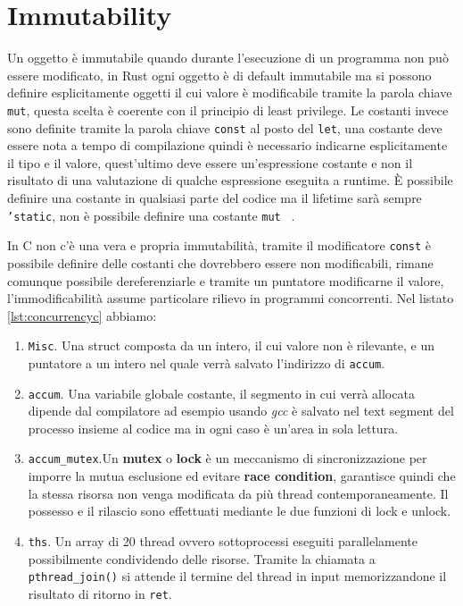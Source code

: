\documentclass[Lau,binding=0.6cm]{sapthesis}
\newcommand{\textcode}[1]{\colorbox{backcolour}{\texttt{#1}}}
\begin{document}
\section{Immutability}
Un oggetto è immutabile quando durante l'esecuzione di un programma non può essere modificato, in Rust ogni oggetto è di default immutabile ma si possono definire esplicitamente oggetti il cui valore è modificabile tramite la parola chiave \textcode{mut}, questa scelta è coerente con il principio di least privilege.
Le costanti invece sono definite tramite la parola chiave \textcode{const} al posto del \textcode{let}, una costante deve essere nota a tempo di compilazione quindi è necessario indicarne esplicitamente il tipo e il valore, quest'ultimo deve essere un'espressione costante e non il risultato di una valutazione di qualche espressione eseguita a runtime.
È possibile definire una costante in qualsiasi parte del codice ma il lifetime sarà sempre \textcode{'static}, non è possibile definire una costante \textcode{mut} ~\cite[3.1]{rust:language}.

In C non c'è una vera e propria immutabilità, tramite il modificatore \textcode{const} è possibile definire delle costanti che dovrebbero essere non modificabili, rimane comunque possibile dereferenziarle e tramite un puntatore modificarne il valore, l'immodificabilità assume particolare rilievo in programmi concorrenti. 
Nel listato \ref{lst:concurrencyc} abbiamo:
\begin{enumerate}
    \item \textcode{Misc}. Una struct composta da un intero, il cui valore non è rilevante, e un puntatore a un intero nel quale verrà salvato l'indirizzo di \textcode{accum}. 
    \item \textcode{accum}. Una variabile globale costante, il segmento in cui verrà allocata dipende dal compilatore ad esempio usando \textit{gcc} è salvato nel text segment del processo insieme al codice ma in ogni caso è un'area in sola lettura.
    \item \textcode{accum\_mutex}.Un \textbf{mutex} o \textbf{lock} è un meccanismo di sincronizzazione per imporre la mutua esclusione ed evitare \textbf{race condition}, garantisce quindi che la stessa risorsa non venga modificata da più thread contemporaneamente.
    Il possesso e il rilascio sono effettuati mediante le due funzioni di lock e unlock.
    \item \texttt{ths}. Un array di 20 thread ovvero sottoprocessi eseguiti parallelamente possibilmente condividendo delle risorse.
    Tramite la chiamata a \textcode{pthread\_join()} si attende il termine del thread in input memorizzandone il risultato di ritorno in \textcode{ret}. 
\end{enumerate}
\end{document}
